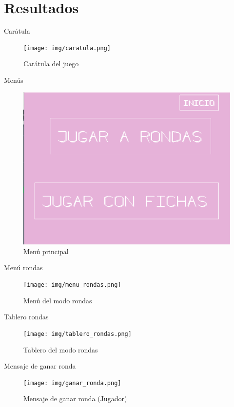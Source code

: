 \section{Resultados} 

\begin{frame}{Carátula}
    \begin{figure}
        \centering
        \texttt{[image: img/caratula.png]}
        \caption{Carátula del juego}
        \label{fig:caratula}
    \end{figure}
\end{frame}

\begin{frame}{Menús}
    \begin{figure}
        \centering
        \includegraphics[width=0.6\linewidth]{img/menú_principal.png}
        \caption{Menú principal}
        \label{fig:principal}
    \end{figure}
\end{frame}

\begin{frame}{Menú rondas}
    \begin{figure}
        \centering
        \texttt{[image: img/menu\_rondas.png]}
        \caption{Menú del modo rondas}
        \label{fig:rondas}
    \end{figure}
\end{frame}

\begin{frame}{Tablero rondas}
    \begin{figure}
        \centering
        \texttt{[image: img/tablero\_rondas.png]}
        \caption{Tablero del modo rondas}
        \label{fig:rondas-tablero}
    \end{figure}
\end{frame}

\begin{frame}{Mensaje de ganar ronda}
    \begin{figure}
        \centering
        \texttt{[image: img/ganar\_ronda.png]}
        \caption{Mensaje de ganar ronda (Jugador)}
        \label{fig:ganar_ronda}
    \end{figure}
\end{frame}

